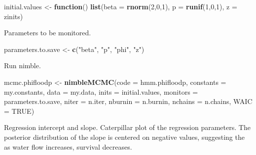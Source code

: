 \documentclass[
  12pt,
]{krantz}
\newenvironment{Shaded}{\begin{snugshade}}{\end{snugshade}}
\newcommand{\AttributeTok}[1]{\textcolor[rgb]{0.13,0.29,0.53}{#1}}
\newcommand{\ConstantTok}[1]{\textcolor[rgb]{0.56,0.35,0.01}{#1}}
\newcommand{\ControlFlowTok}[1]{\textcolor[rgb]{0.13,0.29,0.53}{\textbf{#1}}}
\newcommand{\DecValTok}[1]{\textcolor[rgb]{0.00,0.00,0.81}{#1}}
\newcommand{\FunctionTok}[1]{\textcolor[rgb]{0.13,0.29,0.53}{\textbf{#1}}}
\newcommand{\NormalTok}[1]{#1}
\newcommand{\OtherTok}[1]{\textcolor[rgb]{0.56,0.35,0.01}{#1}}
\newcommand{\StringTok}[1]{\textcolor[rgb]{0.31,0.60,0.02}{#1}}
\begin{document}
\begin{Shaded}
\begin{Highlighting}[]
\NormalTok{initial.values }\OtherTok{\textless{}{-}} \ControlFlowTok{function}\NormalTok{() }\FunctionTok{list}\NormalTok{(}\AttributeTok{beta =} \FunctionTok{rnorm}\NormalTok{(}\DecValTok{2}\NormalTok{,}\DecValTok{0}\NormalTok{,}\DecValTok{1}\NormalTok{),}
                                  \AttributeTok{p =} \FunctionTok{runif}\NormalTok{(}\DecValTok{1}\NormalTok{,}\DecValTok{0}\NormalTok{,}\DecValTok{1}\NormalTok{),}
                                  \AttributeTok{z =}\NormalTok{ zinits)}
\end{Highlighting}
\end{Shaded}

Parameters to be monitored.

\begin{Shaded}
\begin{Highlighting}[]
\NormalTok{parameters.to.save }\OtherTok{\textless{}{-}} \FunctionTok{c}\NormalTok{(}\StringTok{"beta"}\NormalTok{, }\StringTok{"p"}\NormalTok{, }\StringTok{"phi"}\NormalTok{, }\StringTok{"z"}\NormalTok{)}
\end{Highlighting}
\end{Shaded}

Run nimble.

\begin{Shaded}
\begin{Highlighting}[]
\NormalTok{mcmc.phifloodp }\OtherTok{\textless{}{-}} \FunctionTok{nimbleMCMC}\NormalTok{(}\AttributeTok{code =}\NormalTok{ hmm.phifloodp, }
                          \AttributeTok{constants =}\NormalTok{ my.constants,}
                          \AttributeTok{data =}\NormalTok{ my.data,              }
                          \AttributeTok{inits =}\NormalTok{ initial.values,}
                          \AttributeTok{monitors =}\NormalTok{ parameters.to.save,}
                          \AttributeTok{niter =}\NormalTok{ n.iter,}
                          \AttributeTok{nburnin =}\NormalTok{ n.burnin, }
                          \AttributeTok{nchains =}\NormalTok{ n.chains,}
                          \AttributeTok{WAIC =} \ConstantTok{TRUE}\NormalTok{)}
\end{Highlighting}
\end{Shaded}

Regression intercept and slope. Caterpillar plot of the regression parameters. The posterior distribution of the slope is centered on negative values, suggesting the as water flow increases, survival decreases.
\end{document}
